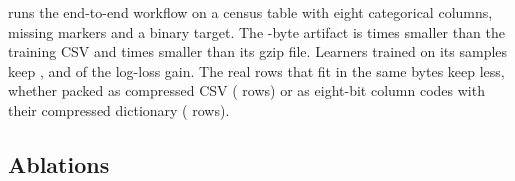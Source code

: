 \documentclass{article}
\theoremstyle{remark}
\begin{document}
\begin{table}[t]
\caption{\textbf{UCI Adult through the table workflow, scored on the official test file.} Cells are
log-loss retention / AUC. The artifact holds the column plan (names and category labels included) and the
packed program; categories are one-hot encoded for every learner downstream.}
\label{tab:adult}
\centering
\footnotesize
\setlength{\tabcolsep}{4pt}
\end{table}

 runs the end-to-end workflow on a census table with eight categorical columns, missing
markers and a binary target. The \AdultBytes-byte artifact is \AdultCsvFactor{} times smaller than the
training CSV and \AdultGzipFactor{} times smaller than its gzip file. Learners trained on its samples keep
\AdultDopeLogistic, \AdultDopeMlp{} and \AdultDopeCatboost{} of the log-loss gain. The real rows that fit
in the same bytes keep less, whether packed as compressed CSV (\AdultSubsetRowsCsv{} rows) or as eight-bit
column codes with their compressed dictionary (\AdultSubsetRowsCodes{} rows).

\subsection{Ablations}

\begin{table}[t]
\caption{\textbf{The DOPE ladder on the equal-byte study.} Medians over tables of charged bytes (program
plus scaling) and worst-learner retention; the last column counts tables at or above $\cTau$. The last two
rows are references: the untrained CPU default, and the headline-shape programs charged as the historical
harness charged them.}
\label{tab:ladder}
\centering
\footnotesize
\setlength{\tabcolsep}{4pt}
\end{table}
\end{document}
